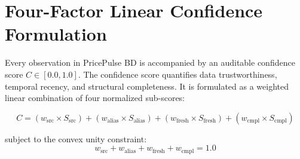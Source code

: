 \section{Four-Factor Linear Confidence Formulation}
Every observation in PricePulse BD is accompanied by an auditable confidence score $C \in [0.0, 1.0]$. The confidence score quantifies data trustworthiness, temporal recency, and structural completeness. It is formulated as a weighted linear combination of four normalized sub-scores:

\begin{equation}
\label{eq:confidence}
C = (w_{\text{src}} \times S_{\text{src}}) + (w_{\text{alias}} \times S_{\text{alias}}) + (w_{\text{fresh}} \times S_{\text{fresh}}) + (w_{\text{cmpl}} \times S_{\text{cmpl}})
\end{equation}

subject to the convex unity constraint:
\begin{equation}
w_{\text{src}} + w_{\text{alias}} + w_{\text{fresh}} + w_{\text{cmpl}} = 1.0
\end{equation}

